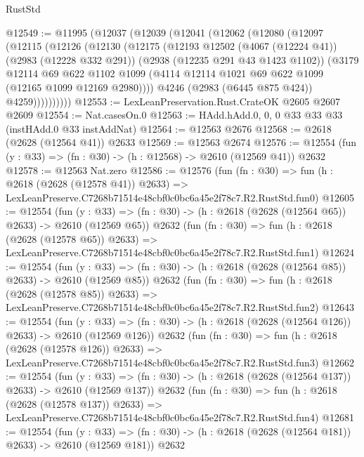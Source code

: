 \begin{lexlean}{RustStd}
\begin{coremodule}
@12549 := @11995
    (@12037
      (@12039
        (@12041
          (@12062
            (@12080
              (@12097
                (@12115
                  (@12126
                    (@12130
                      (@12175
                        (@12193
                          @12502
                          (@4067 (@12224 @41))
                          (@2983 (@12228 @332 @291))
                          (@2938 (@12235 @291 @43 @1423 @1102))
                          (@3179
                            @12114
                            @69
                            @622
                            @1102
                            @1099
                            (@4114 @12114 @1021 @69 @622 @1099 (@12165 @1099 @12169 @2980))))
                        @4246
                        (@2983 (@6445 @875 @424))
                        @4259))))))))))
@12553 := LexLeanPreservation.Rust.CrateOK @2605 @2607 @2609
@12554 := Nat.casesOn.{0}
@12563 := HAdd.hAdd.{0, 0, 0} @33 @33 @33 (instHAdd.{0} @33 instAddNat)
@12564 := @12563 @2676
@12568 := @2618 (@2628 (@12564 @41)) @2633
@12569 := @12563 @2674
@12576 := @12554 (fun (y : @33) => (fn : @30) -> (h : @12568) -> @2610 (@12569 @41)) @2632
@12578 := @12563 Nat.zero
@12586 := @12576
    (fun (fn : @30) =>
    fun (h : @2618 (@2628 (@12578 @41)) @2633) =>
    LexLeanPreserve.C7268b71514e48cbf0c0bc6a45e2f78c7.R2.RustStd.fun0)
@12605 := @12554
    (fun (y : @33) => (fn : @30) -> (h : @2618 (@2628 (@12564 @65)) @2633) -> @2610 (@12569 @65))
    @2632
    (fun (fn : @30) =>
    fun (h : @2618 (@2628 (@12578 @65)) @2633) =>
    LexLeanPreserve.C7268b71514e48cbf0c0bc6a45e2f78c7.R2.RustStd.fun1)
@12624 := @12554
    (fun (y : @33) => (fn : @30) -> (h : @2618 (@2628 (@12564 @85)) @2633) -> @2610 (@12569 @85))
    @2632
    (fun (fn : @30) =>
    fun (h : @2618 (@2628 (@12578 @85)) @2633) =>
    LexLeanPreserve.C7268b71514e48cbf0c0bc6a45e2f78c7.R2.RustStd.fun2)
@12643 := @12554
    (fun (y : @33) => (fn : @30) -> (h : @2618 (@2628 (@12564 @126)) @2633) -> @2610 (@12569 @126))
    @2632
    (fun (fn : @30) =>
    fun (h : @2618 (@2628 (@12578 @126)) @2633) =>
    LexLeanPreserve.C7268b71514e48cbf0c0bc6a45e2f78c7.R2.RustStd.fun3)
@12662 := @12554
    (fun (y : @33) => (fn : @30) -> (h : @2618 (@2628 (@12564 @137)) @2633) -> @2610 (@12569 @137))
    @2632
    (fun (fn : @30) =>
    fun (h : @2618 (@2628 (@12578 @137)) @2633) =>
    LexLeanPreserve.C7268b71514e48cbf0c0bc6a45e2f78c7.R2.RustStd.fun4)
@12681 := @12554
    (fun (y : @33) => (fn : @30) -> (h : @2618 (@2628 (@12564 @181)) @2633) -> @2610 (@12569 @181))
    @2632

\end{coremodule}
\end{lexlean}
